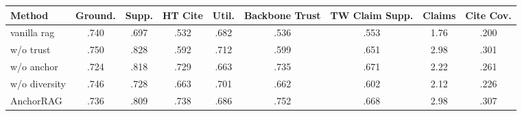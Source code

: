 \begin{tabular}{lcccccccc}
\toprule
Method & Ground. & Supp. & HT Cite & Util. & Backbone Trust & TW Claim Supp. & Claims & Cite Cov. \\
\midrule
vanilla rag & .740 & .697 & .532 & .682 & .536 & .553 & 1.76 & .200 \\
w/o trust & .750 & .828 & .592 & .712 & .599 & .651 & 2.98 & .301 \\
w/o anchor & .724 & .818 & .729 & .663 & .735 & .671 & 2.22 & .261 \\
w/o diversity & .746 & .728 & .663 & .701 & .662 & .602 & 2.12 & .226 \\
AnchorRAG & .736 & .809 & .738 & .686 & .752 & .668 & 2.98 & .307 \\
\bottomrule
\end{tabular}
